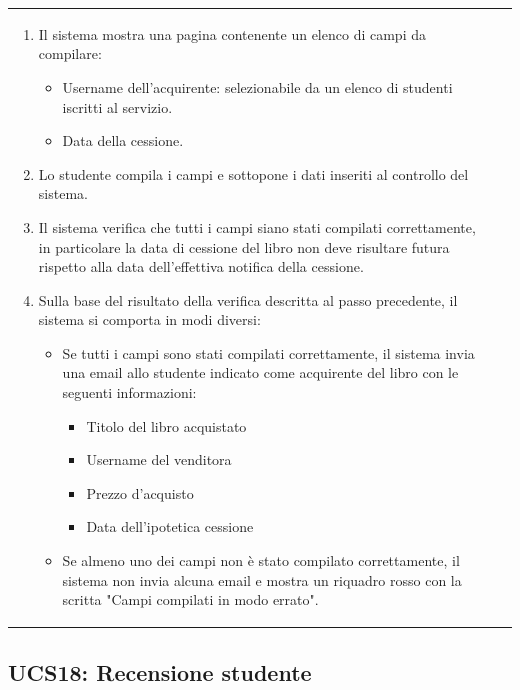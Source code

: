 \documentclass[10pt,a4paper]{report}
\begin{document}
\begin{tabular}{lp{}}
\begin{enumerate}
			
			\item Il sistema mostra una pagina contenente un elenco di campi da compilare:
			\begin{itemize}
				\item Username dell'acquirente: selezionabile da un elenco di studenti iscritti al servizio.
				\item Data della cessione.
			\end{itemize}
			\item Lo studente compila i campi e sottopone i dati inseriti al controllo del sistema.
			\item Il sistema verifica che tutti i campi siano stati compilati correttamente, in particolare la data di cessione del libro non deve risultare futura rispetto alla data dell'effettiva notifica della cessione.
			\item Sulla base del risultato della verifica descritta al passo precedente, il sistema si comporta in modi diversi:
			\begin{itemize}
				\item Se tutti i campi sono stati compilati correttamente, il sistema invia una email allo studente indicato come acquirente del libro con le seguenti informazioni:
				\begin{itemize}
					\item Titolo del libro acquistato
					\item Username del venditora
					\item Prezzo d'acquisto
					\item Data dell'ipotetica cessione
				\end{itemize}
				\item Se almeno uno dei campi non è stato compilato correttamente, il sistema non invia alcuna email e mostra un riquadro rosso con la scritta "Campi compilati in modo errato".
			\end{itemize}
		\end{enumerate}
	\end{tabular}

	\subsection{UCS18: Recensione studente}
\end{document}
